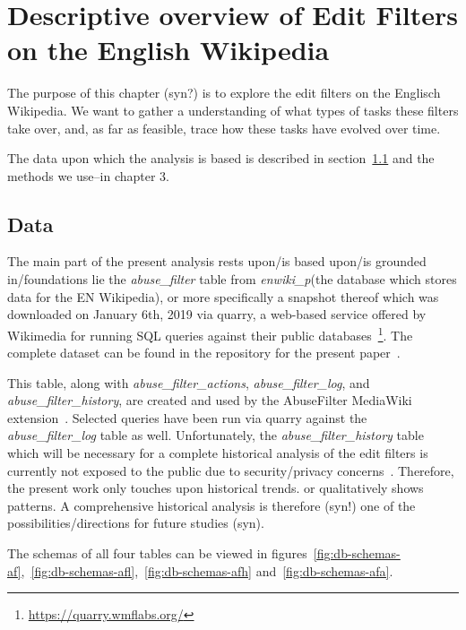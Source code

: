 \chapter{Descriptive overview of Edit Filters on the English Wikipedia}
\label{chap:overview-en-wiki}

The purpose of this chapter (syn?) is to explore the edit filters on the Englisch Wikipedia.
We want to gather a understanding of what types of tasks these filters take over,
and, as far as feasible, trace how these tasks have evolved over time.

The data upon which the analysis is based is described in section~\ref{sec:overview-data}
and the methods we use–in chapter 3.


\section{Data}
\label{sec:overview-data}

The main part of the present analysis rests upon/is based upon/is grounded in/foundations lie the \emph{abuse\_filter} table from \emph{enwiki\_p}(the database which stores data for the EN Wikipedia), or more specifically a snapshot thereof which was downloaded on January 6th, 2019 via quarry, a web-based service offered by Wikimedia for running SQL queries against their public databases~\footnote{\url{https://quarry.wmflabs.org/}}.
The complete dataset can be found in the repository for the present paper~\cite{github}. %

This table, along with \emph{abuse\_filter\_actions}, \emph{abuse\_filter\_log}, and \emph{abuse\_filter\_history}, are created and used by the AbuseFilter MediaWiki extension~\cite{gerrit-abusefilter-tables}.
Selected queries have been run via quarry against the \emph{abuse\_filter\_log} table as well.
Unfortunately, the \emph{abuse\_filter\_history} table which will be necessary for a complete historical analysis of the edit filters is currently not exposed to the public due to security/privacy concerns~\cite{phabricator}.
Therefore, the present work only touches upon historical trends. %
or qualitatively shows patterns.
A comprehensive historical analysis is therefore (syn!) one of the possibilities/directions for future studies (syn).

The schemas of all four tables can be viewed in figures~\ref{fig:db-schemas-af},~\ref{fig:db-schemas-afl},~\ref{fig:db-schemas-afh} and~\ref{fig:db-schemas-afa}.

